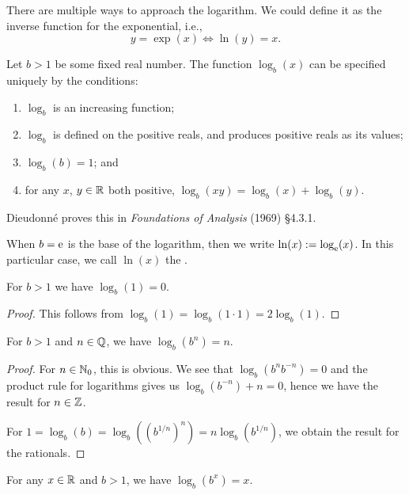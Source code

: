 \begin{node}[Logarithm]\label{calculus-000G}%
There are multiple ways to approach the logarithm. We could define it as
the inverse function for the exponential, i.e.,
\[y=\exp(x)\iff \ln(y)=x.\]

\begin{node}\label{calculus-000J}%
Let $b>1$ be some fixed real number. The function $\log_{b}(x)$ can be
specified uniquely by the conditions:
\begin{enumerate}
\item $\log_{b}$ is an increasing function;
\item $\log_{b}$ is defined on the positive reals, and produces positive
  reals as its values;
\item $\log_{b}(b)=1$; and
\item for any $x$, $y\in\mathbb{R}$ both positive, $\log_{b}(xy)=\log_{b}(x)+\log_{b}(y)$.
\end{enumerate}
Dieudonn\'e proves this in \textit{Foundations of Analysis} (1969) \S4.3.1.
\end{node}

\begin{node}[Notation]\label{calculus-000R}%
When $b=\mathrm{e}$ is the base of the logarithm, then we write $\ln(x):=\log_{\mathrm{e}}(x)$.
In this particular case, we call $\ln(x)$ the .
\end{node}

\begin{lemma}\label{calculus-000L}
For $b>1$ we have $\log_{b}(1)=0$.
\end{lemma}

\begin{proof}
This follows from $\log_{b}(1)=\log_{b}(1\cdot 1)=2\log_{b}(1)$.
\end{proof}

\begin{lemma}\label{calculus-000K}
For $b>1$ and $n\in\mathbb{Q}$, we have $\log_{b}(b^{n})=n$.
\end{lemma}

\begin{proof}
For $n\in\mathbb{N}_{0}$, this is obvious. We see that
$\log_{b}(b^{n}b^{-n})=0$ and the product rule for logarithms gives us
$\log_{b}(b^{-n})+n=0$, hence we have the result for $n\in\mathbb{Z}$.

For $1=\log_{b}(b)=\log_{b}((b^{1/n})^{n})=n\log_{b}(b^{1/n})$, we
obtain the result for the rationals.
\end{proof}

\begin{theorem}\label{calculus-000M}
For any $x\in\mathbb{R}$ and $b>1$, we have $\log_{b}(b^{x})=x$.
\end{theorem}


\end{node}
